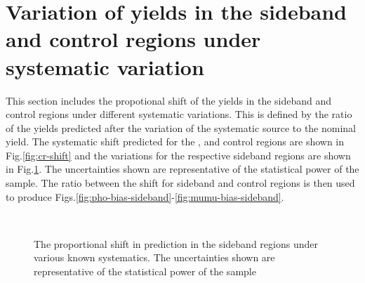 \section{Variation of yields in the sideband and control regions under systematic variation}
\label{app:prop-shift-syst}
This section includes the propotional shift of the yields in the sideband and control regions
under different systematic variations. This is defined by the ratio of the yields predicted after
the variation of the systematic source to the nominal yield. The systematic shift predicted for the
\mj, \mmj and \gj control regions are shown in 
Fig.\ref{fig:cr-shift} and the variations for the respective sideband 
regions are shown in Fig.\ref{fig:sideband-shift}. 
The uncertainties shown are representative of the statistical
power of the sample. The ratio between the shift for sideband and control 
regions is then used to produce Figs.\ref{fig:pho-bias-sideband}-\ref{fig:mumu-bias-sideband}. 

\begin{figure}[!h]
  \centering
  \\
  \caption{The proportional shift in prediction in the sideband regions under various known systematics.
  The uncertainties shown are representative of the statistical power of the sample}

  \label{fig:sideband-shift}
\end{figure}

